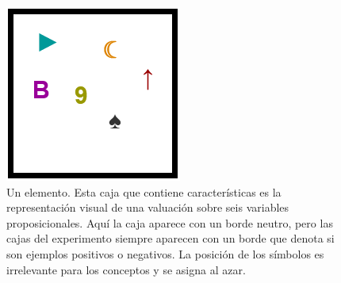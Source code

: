 \begin{figure}[h!] 
\begin{center}
    \includegraphics[scale=0.6]{../figuras/brm/BordeNeutro.PNG}
	\caption{
	Un elemento. Esta caja que contiene características es la representación visual de una valuación sobre seis variables proposicionales. Aquí la caja aparece con un borde neutro, pero las cajas del experimento siempre aparecen con un borde que denota si son ejemplos positivos o negativos. La posición de los símbolos es irrelevante para los conceptos y se asigna al azar.}
	\label{Figure:element} 
\end{center}
\end{figure}


